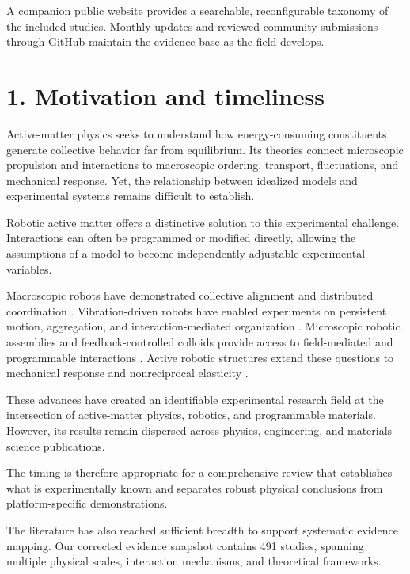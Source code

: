 A companion public website provides a searchable,
reconfigurable taxonomy of the included studies.
Monthly updates and reviewed community submissions
through GitHub maintain the evidence base as the
field develops.

\section*{1. Motivation and timeliness}

Active-matter physics seeks to understand how
energy-consuming constituents generate collective
behavior far from equilibrium. Its theories connect
microscopic propulsion and interactions to macroscopic
ordering, transport, fluctuations, and mechanical
response. Yet, the relationship between idealized
models and experimental systems remains difficult
to establish.

Robotic active matter offers a distinctive solution
to this experimental challenge. Interactions can
often be programmed or modified directly, allowing
the assumptions of a model to become independently
adjustable experimental variables.

Macroscopic robots have demonstrated collective
alignment and distributed coordination
\cite{Turgut2008selforganizedflocka,Vsrhelyi2018optimizedflockingo,Zhou2024anticipationpromote}.
Vibration-driven robots have enabled experiments
on persistent motion, aggregation, and
interaction-mediated organization
\cite{Welch2018aggregatesuppressio,Deblais2019howtoforceanarmy,Chvykov2020lowrattlingapred}.
Microscopic robotic assemblies and
feedback-controlled colloids provide access
to field-mediated and programmable interactions
\cite{Xie2020bioinspiredsoftmic,Pauer2021programmabledesign,Buerle2020formationofstable,Heuthe2025tunablecolloidalsw}.
Active robotic structures extend these
questions to mechanical response and
nonreciprocal elasticity
\cite{Brandenbourger2021limitcyclesturnac,Coulais2025activemetamaterials}.

These advances have created an identifiable
experimental research field at the intersection
of active-matter physics, robotics, and
programmable materials. However, its results
remain dispersed across physics, engineering,
and materials-science publications.

The timing is therefore appropriate for
a comprehensive review that establishes
what is experimentally known and separates
robust physical conclusions from
platform-specific demonstrations.

The literature has also reached sufficient
breadth to support systematic evidence mapping.
Our corrected evidence snapshot contains
491 studies, spanning multiple physical scales,
interaction mechanisms, and theoretical
frameworks.

